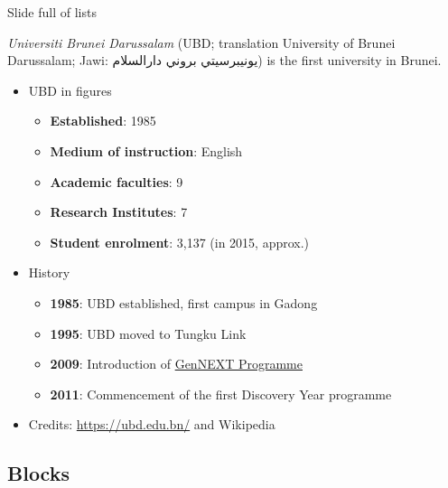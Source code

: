 \documentclass[,]{beamer}
\providecommand{\tightlist}{%
  \setlength{\itemsep}{0pt}\setlength{\parskip}{0pt}}
\begin{document}
\begin{frame}{Slide full of lists}
\protect\hypertarget{slide-full-of-lists}{}

\emph{Universiti Brunei Darussalam} (UBD; translation University of
Brunei Darussalam; Jawi: \textarabic{يونيبرسيتي بروني دارالسلام}) is the
first university in Brunei.

\begin{itemize}
\tightlist
\item
  UBD in figures

  \begin{itemize}
  \tightlist
  \item
    \textbf{Established}: 1985
  \item
    \textbf{Medium of instruction}: English
  \item
    \textbf{Academic faculties}: 9
  \item
    \textbf{Research Institutes}: 7
  \item
    \textbf{Student enrolment}: 3,137 (in 2015, approx.)
  \end{itemize}
\item
  History

  \begin{itemize}
  \tightlist
  \item
    \textbf{1985}: UBD established, first campus in Gadong
  \item
    \textbf{1995}: UBD moved to Tungku Link
  \item
    \textbf{2009}: Introduction of
    \href{https://ubd.edu.bn/admission/undergraduate/gennext-degree-programme/}{GenNEXT
    Programme}
  \item
    \textbf{2011}: Commencement of the first Discovery Year programme\\
  \end{itemize}
\item
  Credits: \url{https://ubd.edu.bn/} and Wikipedia
\end{itemize}

\end{frame}

\hypertarget{blocks}{%
\subsection{Blocks}\label{blocks}}
\end{document}
